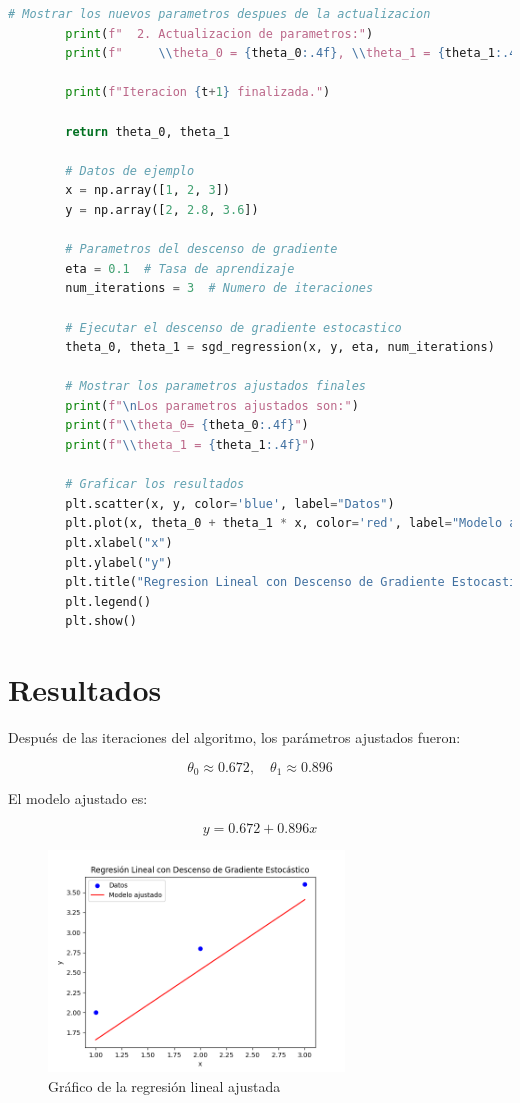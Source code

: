 \documentclass[a5paper]{article}
\begin{document}
\begin{lstlisting}[language=Python, caption=Regresión Lineal con SGD, frame=single]
		# Mostrar los nuevos parametros despues de la actualizacion
		print(f"  2. Actualizacion de parametros:")
		print(f"     \\theta_0 = {theta_0:.4f}, \\theta_1 = {theta_1:.4f}")
		
		print(f"Iteracion {t+1} finalizada.")
		
		return theta_0, theta_1
		
		# Datos de ejemplo
		x = np.array([1, 2, 3])
		y = np.array([2, 2.8, 3.6])
		
		# Parametros del descenso de gradiente
		eta = 0.1  # Tasa de aprendizaje
		num_iterations = 3  # Numero de iteraciones
		
		# Ejecutar el descenso de gradiente estocastico
		theta_0, theta_1 = sgd_regression(x, y, eta, num_iterations)
		
		# Mostrar los parametros ajustados finales
		print(f"\nLos parametros ajustados son:")
		print(f"\\theta_0= {theta_0:.4f}")
		print(f"\\theta_1 = {theta_1:.4f}")
		
		# Graficar los resultados
		plt.scatter(x, y, color='blue', label="Datos")
		plt.plot(x, theta_0 + theta_1 * x, color='red', label="Modelo ajustado")
		plt.xlabel("x")
		plt.ylabel("y")
		plt.title("Regresion Lineal con Descenso de Gradiente Estocastico")
		plt.legend()
		plt.show()
	\end{lstlisting}
	
	\section*{Resultados}
	
	Después de las iteraciones del algoritmo, los parámetros ajustados fueron:
	
	\[
	\theta_0 \approx 0.672, \quad \theta_1 \approx 0.896
	\]
	
	El modelo ajustado es:
	
	\[
	y = 0.672 + 0.896x
	\]
	
	\begin{figure}[h]
		\centering
		\includegraphics[width=0.7\textwidth]{modelo_ajustado.png}
		\caption{Gráfico de la regresión lineal ajustada}
	\end{figure}
	
\end{document}
